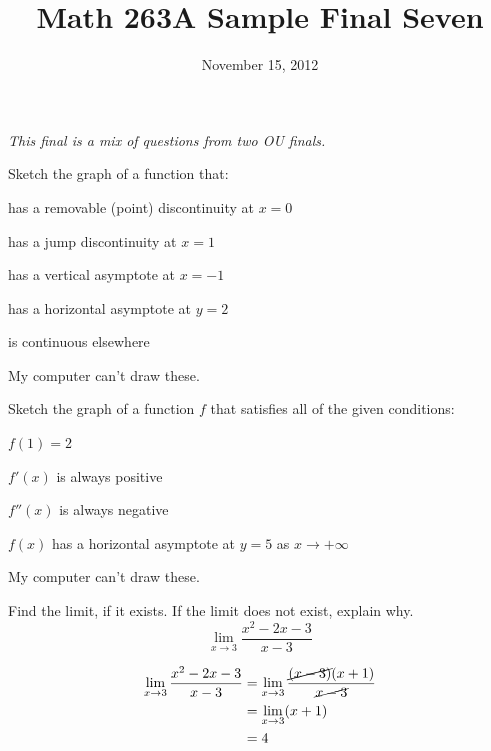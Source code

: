 \documentclass[fleqn,addpoints]{exam}
\title{Math 263A Sample Final Seven}
\date{November 15, 2012}
\author{}
\begin{document}
\maketitle  

{\em This final is a mix of questions from two OU finals.}

\begin{questions}

\question Sketch the graph of a function that:
\begin{itemize*}
\item has a removable (point) discontinuity at $x = 0$
\item has a jump discontinuity at $x = 1$
\item has a vertical asymptote at $x = -1$ 
\item has a horizontal asymptote at $y = 2$
\item is continuous elsewhere
\end{itemize*}

\begin{solution}
  My computer can't draw these.
\end{solution}

\question Sketch the graph of a function $f$ that satisfies all of the given conditions: 
\begin{itemize*}
\item $f(1) = 2$
\item $f'(x)$ is always positive
\item $f''(x)$ is always negative
\item $f(x)$ has a horizontal asymptote at $y = 5$ as $x \rightarrow +\infty$
\end{itemize*}

\begin{solution}
  My computer can't draw these.
\end{solution}

\ifprintanswers
\pagebreak
\fi

\question Find the limit, if it exists. If the limit does not exist, explain why.
\[
  \lim_{x \to 3} \frac{x^2 - 2x - 3}{x - 3}
\]

\begin{solution}
\begin{align*}
  \lim_{x \to 3} \frac{x^2 - 2x - 3}{x - 3} &= \lim_{x \to 3} \frac{\cancel{(x - 3)}(x + 1)}{\cancel{x - 3}} \\
    &= \lim_{x \to 3} (x + 1) \\
    &= 4 \\
\end{align*}


\end{solution}
\end{questions}
\end{document}
